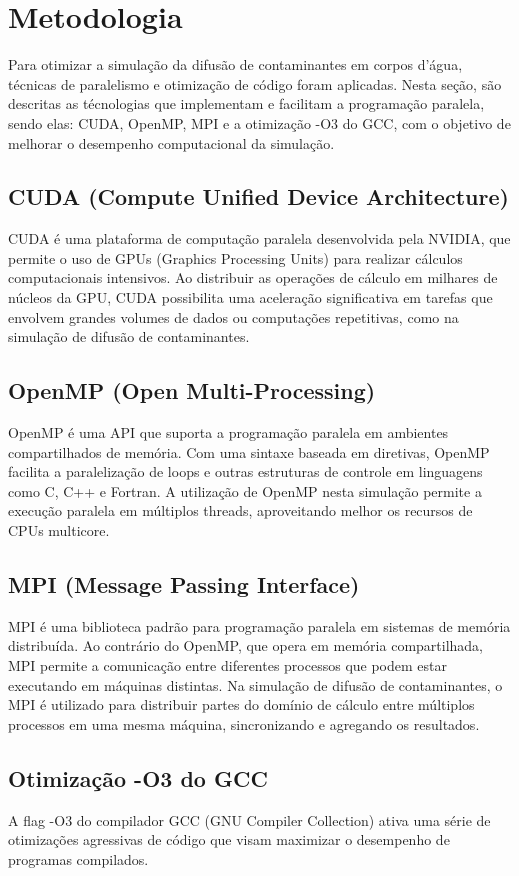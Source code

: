 \section{Metodologia}

Para otimizar a simulação da difusão de contaminantes em corpos d'água, técnicas de paralelismo e otimização de código foram aplicadas. Nesta seção, são descritas as técnologias que implementam e facilitam a programação paralela, sendo elas: CUDA, OpenMP, MPI e a otimização -O3 do GCC, com o objetivo de melhorar o desempenho computacional da simulação.

\subsection{CUDA (Compute Unified Device Architecture)}

CUDA é uma plataforma de computação paralela desenvolvida pela NVIDIA, que permite o uso de GPUs (Graphics Processing Units) para realizar cálculos computacionais intensivos. Ao distribuir as operações de cálculo em milhares de núcleos da GPU, CUDA possibilita uma aceleração significativa em tarefas que envolvem grandes volumes de dados ou computações repetitivas, como na simulação de difusão de contaminantes.

\subsection{OpenMP (Open Multi-Processing)}

OpenMP é uma API que suporta a programação paralela em ambientes compartilhados de memória. Com uma sintaxe baseada em diretivas, OpenMP facilita a paralelização de loops e outras estruturas de controle em linguagens como C, C++ e Fortran. A utilização de OpenMP nesta simulação permite a execução paralela em múltiplos threads, aproveitando melhor os recursos de CPUs multicore.

\subsection{MPI (Message Passing Interface)}

MPI é uma biblioteca padrão para programação paralela em sistemas de memória distribuída. Ao contrário do OpenMP, que opera em memória compartilhada, MPI permite a comunicação entre diferentes processos que podem estar executando em máquinas distintas. Na simulação de difusão de contaminantes, o MPI é utilizado para distribuir partes do domínio de cálculo entre múltiplos processos em uma mesma máquina, sincronizando e agregando os resultados.

\subsection{Otimização -O3 do GCC}

A flag -O3 do compilador GCC (GNU Compiler Collection) ativa uma série de otimizações agressivas de código que visam maximizar o desempenho de programas compilados.
